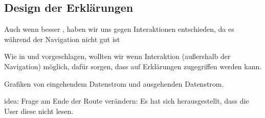 \subsection{Design der Erklärungen}

Auch wenn besser \cite{riveiro_thats_2021}, haben wir uns gegen Interaktionen entschieden, da es während der Navigation nicht gut ist

Wie in \cite{chazette_end-users_nodate} und \cite{wang_integration_2020} vorgeschlagen, wollten wir wenn Interaktion (außershalb der Navigation) möglich, dafür sorgen, dass auf Erklärungen zugegriffen werden kann.


Grafiken von eingehendem Datenstrom und ausgehenden Datenstrom.

idea: Frage am Ende der Route verändern: Es hat sich herausgestellt, dass die User diese nicht lesen.